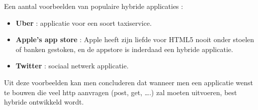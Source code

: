 Een aantal voorbeelden van populaire hybride applicaties : 

\begin{itemize}
	\item \textbf{Uber} : applicatie voor een soort taxiservice.
	\item \textbf{Apple's app store} : Apple heeft zijn liefde voor HTML5 nooit onder stoelen of banken gestoken, en de appstore is inderdaad een hybride applicatie.
	\item \textbf{Twitter} : sociaal netwerk applicatie.
\end{itemize}

Uit deze voorbeelden kan men concluderen dat wanneer men een applicatie wenst te bouwen die veel http aanvragen (post, get, ….) zal moeten uitvoeren, best hybride ontwikkeld wordt.
	
